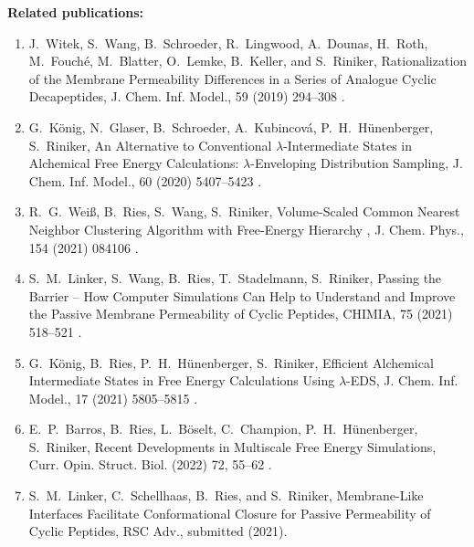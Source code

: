 \newpage
\noindent \textbf{Related publications:}
\begin{enumerate}
    \item J.\ Witek, S.\ Wang, B.\ Schroeder, R.\ Lingwood, A.\ Dounas, H.\ Roth, M.\ Fouché, M.\ Blatter, O.\ Lemke, B.\ Keller, and S.\ Riniker, Rationalization of the Membrane Permeability Differences in a Series of Analogue Cyclic Decapeptides, {J. Chem. Inf. Model.}, {59} (2019) 294--308 .
    \item  G.\ K\"onig, N.\ Glaser, B.\ Schroeder, A.\ Kubincová, P.\ H.\ H\"unenberger, S.\ Riniker, An Alternative to Conventional $\lambda$-Intermediate States in Alchemical Free Energy Calculations: $\lambda$-Enveloping Distribution Sampling, {J. Chem. Inf. Model.}, {60} (2020) 5407--5423 .
    \item R.\ G.\ Wei\ss, B.\ Ries, S.\ Wang, S.\ Riniker, Volume-Scaled Common Nearest Neighbor Clustering Algorithm with Free-Energy Hierarchy , {J. Chem. Phys.}, {154} (2021) 084106 .
    \item S.\ M.\ Linker, S.\ Wang, B.\ Ries, T.\ Stadelmann, S.\ Riniker, Passing the Barrier – How Computer Simulations Can Help to Understand and Improve the Passive Membrane Permeability of Cyclic Peptides, {CHIMIA}, {75} (2021) 518--521 .
    \item G.\ K\"onig, B.\ Ries, P.\ H.\ H\"unenberger, S.\ Riniker, Efficient Alchemical Intermediate States in Free Energy Calculations Using  $\lambda$-EDS, {J. Chem. Inf. Model.}, {17} (2021) 5805--5815 .
    \item E.\ P.\ Barros, B.\ Ries, L.\ B\"oselt, C.\ Champion, P.\ H.\ H\"unenberger, S.\ Riniker, Recent Developments in Multiscale Free Energy Simulations, {Curr. Opin. Struct. Biol.} (2022) {72}, 55--62 .
    \item S.\ M.\ Linker, C.\ Schellhaas, B.\ Ries, and S.\ Riniker, Membrane-Like Interfaces Facilitate Conformational Closure for Passive Permeability of Cyclic Peptides, {RSC Adv.}, submitted (2021).

\end{enumerate}
